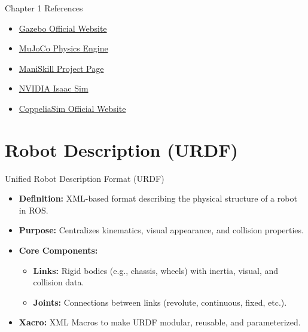 \documentclass[aspectratio=169]{beamer}
\begin{document}
\begin{frame}[t]{Chapter 1 References}
    \begin{itemize}
        \item \href{https://gazebosim.org}{Gazebo Official Website}
        \item \href{https://mujoco.org}{MuJoCo Physics Engine}
        \item \href{https://maniskill.ai}{ManiSkill Project Page}
        \item \href{https://developer.nvidia.com/isaac-sim}{NVIDIA Isaac Sim}
        \item \href{https://www.coppeliarobotics.com/}{CoppeliaSim Official Website}
    \end{itemize}
\end{frame}

\section{Robot Description (URDF)}

\begin{frame}[t]{Unified Robot Description Format (URDF)}
    \begin{itemize}
        \item \textbf{Definition:} XML-based format describing the physical structure of a robot in ROS.
        \item \textbf{Purpose:} Centralizes kinematics, visual appearance, and collision properties.
        \item \textbf{Core Components:}
        \begin{itemize}
            \item \textbf{Links:} Rigid bodies (e.g., chassis, wheels) with inertia, visual, and collision data.
            \item \textbf{Joints:} Connections between links (revolute, continuous, fixed, etc.).
        \end{itemize}
        \item \textbf{Xacro:} XML Macros to make URDF modular, reusable, and parameterized.
    \end{itemize}
\end{frame}
\end{document}
